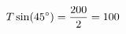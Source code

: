 \documentclass[preview]{standalone}
\begin{document}
\begin{align*}
\special{dvisvgm:raw <g id='unique000'>}T \sin(45^{\circ}) = \frac{200}{2} = 100\special{dvisvgm:raw </g>}
\end{align*}
\end{document}
